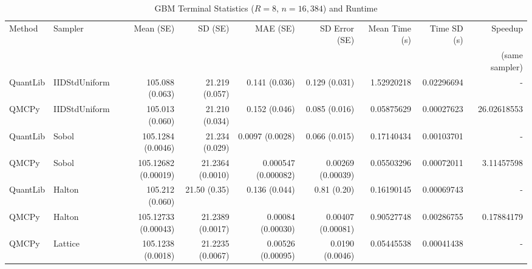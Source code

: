 \begin{table}[tbp]
\caption{GBM Terminal Statistics ($R=8$, $n=16,384$) and Runtime}
\label{tab2}
\begin{tabular}{ll@{\hspace{0.4em}}r@{\hspace{0.4em}}r@{\hspace{0.4em}}r@{\hspace{0.4em}}r@{\hspace{0.4em}}r@{\hspace{0.4em}}r@{\hspace{0.4em}}r}
\toprule
Method & Sampler & Mean (SE) & SD (SE) & MAE (SE) & SD Error (SE) & Mean Time (s) & Time SD (s) & Speedup \\
 & & & & & & & & (same sampler) \\
\midrule
QuantLib & IIDStdUniform & 105.088 (0.063) & 21.219 (0.057) & 0.141 (0.036) & 0.129 (0.031) & 1.52920218 & 0.02296694 & - \\
QMCPy & IIDStdUniform & 105.013 (0.060) & 21.210 (0.034) & 0.152 (0.046) & 0.085 (0.016) & 0.05875629 & 0.00027623 & 26.02618553 \\
QuantLib & Sobol & 105.1284 (0.0046) & 21.234 (0.029) & 0.0097 (0.0028) & 0.066 (0.015) & 0.17140434 & 0.00103701 & - \\
QMCPy & Sobol & 105.12682 (0.00019) & 21.2364 (0.0010) & 0.000547 (0.000082) & 0.00269 (0.00039) & 0.05503296 & 0.00072011 & 3.11457598 \\
QuantLib & Halton & 105.212 (0.060) & 21.50 (0.35) & 0.136 (0.044) & 0.81 (0.20) & 0.16190145 & 0.00069743 & - \\
QMCPy & Halton & 105.12733 (0.00043) & 21.2389 (0.0017) & 0.00084 (0.00030) & 0.00407 (0.00081) & 0.90527748 & 0.00286755 & 0.17884179 \\
QMCPy & Lattice & 105.1238 (0.0018) & 21.2235 (0.0067) & 0.00526 (0.00095) & 0.0190 (0.0046) & 0.05445538 & 0.00041438 & - \\
\bottomrule
\end{tabular}
\end{table}

